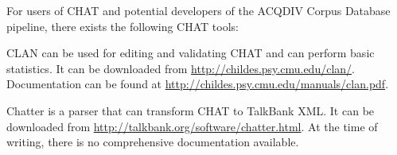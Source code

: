 \documentclass[a4paper, 11pt]{book}
\begin{document}

For users of CHAT and potential developers of the ACQDIV Corpus Database pipeline, there exists the following CHAT tools:

\begin{itemize*}
	\item CLAN can be used for editing and validating CHAT and can perform basic statistics. It can be downloaded from \url{http://childes.psy.cmu.edu/clan/}.
		Documentation can be found at \url{http://childes.psy.cmu.edu/manuals/clan.pdf}. 
	\item Chatter is a parser that can transform CHAT to TalkBank XML. It can be downloaded from \url{http://talkbank.org/software/chatter.html}. 
		At the time of writing, there is no comprehensive documentation available. 
\end{itemize*}



\end{document}
